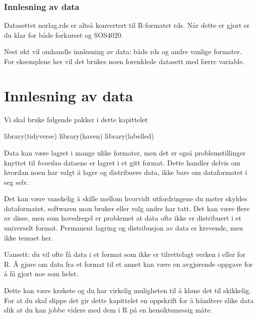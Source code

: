 \documentclass[
  letterpaper,
  DIV=11,
  numbers=noendperiod]{scrreprt}
\newenvironment{Shaded}{\begin{snugshade}}{\end{snugshade}}
\newcommand{\FunctionTok}[1]{\textcolor[rgb]{0.28,0.35,0.67}{#1}}
\newcommand{\NormalTok}[1]{\textcolor[rgb]{0.00,0.23,0.31}{#1}}
\theoremstyle{definition}
\theoremstyle{remark}
\begin{document}
\hypertarget{innlesning-av-data}{%
\subsection{Innlesning av data}\label{innlesning-av-data}}

Datasettet norlag.rds er altså konvertert til R-formatet rds. Når dette
er gjort er du klar for både forkurset og SOS4020.

Nest økt vil omhandle innlesning av data: både rds og andre vanlige
formater. For eksemplene her vil det brukes noen forenklede datasett med
færre variable.

\hypertarget{innlesning-av-data-1}{%
\chapter{Innlesning av data}\label{innlesning-av-data-1}}

Vi skal bruke følgende pakker i dette kapittelet

\begin{Shaded}
\begin{Highlighting}[]
\FunctionTok{library}\NormalTok{(tidyverse)}
\FunctionTok{library}\NormalTok{(haven)}
\FunctionTok{library}\NormalTok{(labelled)}
\end{Highlighting}
\end{Shaded}

Data kan være lagret i mange ulike formater, men det er også
problemstillinger knyttet til \emph{hvordan} dataene er lagret i et gitt
format. Dette handler delvis om hvordan noen har valgt å lagre og
distribuere data, ikke bare om dataformatet i seg selv.

Det kan være vanskelig å skille mellom hvorvidt utfordringene du møter
skyldes dataformatet, softwaren man bruker eller valg andre har tatt.
Det kan være flere av disse, men som hovedregel er problemet at data
ofte ikke er distribuert i et universelt format. Permanent lagring og
distribusjon av data er krevende, men ikke temaet her.

Uansett: du vil ofte få data i et format som ikke er tilrettelagt verken
i eller for R. Å gjøre om data fra et format til et annet kan være en
avgjørende oppgave for å få gjort noe som helst.

Dette kan være krøkete og du har virkelig muligheten til å kløne det til
skikkelig. For at du skal slippe det gir dette kapittelet en oppskrift
for å håndtere slike data slik at du kan jobbe videre med dem i R på en
hensiktsmessig måte.
\end{document}
